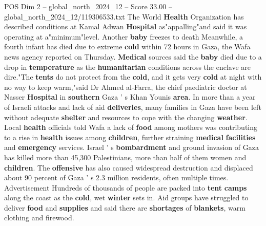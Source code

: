 \begin{textsample}{POS Dim 2 – global\_north\_2024\_12 – Score 33.00 – global\_north\_2024\_12/119306533.txt}
The World \textbf{Health} Organization has described conditions at Kamal Adwan \textbf{Hospital} as"appalling"and said it was operating at a"minimum"level.
Another \textbf{baby} freezes to death Meanwhile, a fourth infant has died due to extreme \textbf{cold} within 72 hours in Gaza, the Wafa news agency reported on Thursday. \textbf{Medical} sources said the \textbf{baby} died due to a drop in \textbf{temperature} as the \textbf{humanitarian} conditions across the enclave are dire."The \textbf{tents} do not protect from the \textbf{cold}, and it gets very \textbf{cold} at night with no way to keep warm,"said Dr Ahmed al-Farra, the chief paediatric doctor at Nasser \textbf{Hospital} in \textbf{southern} Gaza ' s Khan Younis \textbf{area}.
In more than a year of Israeli attacks and lack of aid \textbf{deliveries}, many families in Gaza have been left without adequate \textbf{shelter} and resources to cope with the changing \textbf{weather}.
Local \textbf{health} officials told Wafa a lack of \textbf{food} among mothers was contributing to a rise in \textbf{health} issues among \textbf{children}, further straining \textbf{medical} \textbf{facilities} and \textbf{emergency} services.
Israel ' s \textbf{bombardment} and ground invasion of Gaza has killed more than 45,300 Palestinians, more than half of them women and \textbf{children}.
The \textbf{offensive} has also caused widespread destruction and displaced about 90 percent of Gaza ' s 2.3 million residents, often multiple times.
Advertisement Hundreds of thousands of people are packed into \textbf{tent} \textbf{camps} along the coast as the \textbf{cold}, wet \textbf{winter} sets in.
Aid groups have struggled to deliver \textbf{food} and \textbf{supplies} and said there are \textbf{shortages} of \textbf{blankets}, warm clothing and firewood.

\end{textsample}
